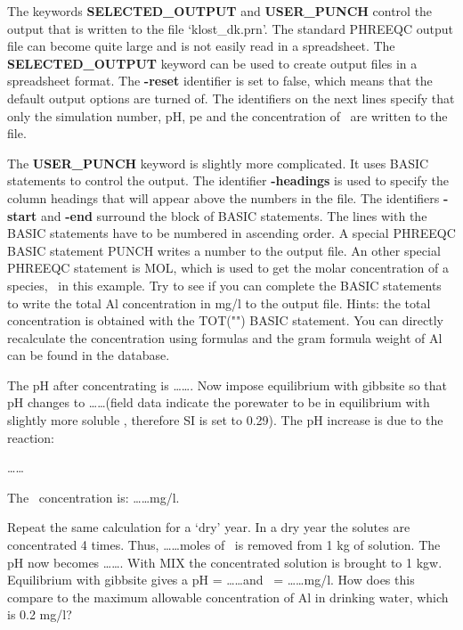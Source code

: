 The keywords \textbf{SELECTED\_OUTPUT} and \textbf{USER\_PUNCH} control the output that is written to the file `klost\_dk.prn'. The standard PHREEQC output file can become quite large and is not easily read in a spreadsheet. The \textbf{SELECTED\_OUTPUT} keyword can be used to create output files in a spreadsheet format. The \textbf{-reset} identifier is set to false, which means that the default output options are turned of. The identifiers on the next lines specify that only the simulation number, pH, pe and the concentration of \ox\ are written to the file.

The \textbf{USER\_PUNCH} keyword is slightly more complicated. It uses BASIC statements to control the output. The identifier \textbf{-headings} is used to specify the column headings that will appear above the numbers in the file. The identifiers \textbf{-start} and \textbf{-end} surround the block of BASIC statements. The lines with the BASIC statements have to be numbered in ascending order. A special PHREEQC BASIC statement PUNCH writes a number to the output file. An other special PHREEQC statement is MOL, which is used to get the molar concentration of a species, \no\ in this example. Try to see if you can complete the BASIC statements to write the total Al concentration in mg/l to the output file. Hints: the total concentration is obtained with the TOT("") BASIC statement. You can directly recalculate the concentration using formulas and the gram formula weight of Al can be found in the database.

The pH after concentrating is \ldots\ldots. Now impose equilibrium with gibbsite so that pH changes to \ldots\ldots (field data indicate the porewater to be in equilibrium with slightly more soluble \gi, therefore SI is set to 0.29). The pH increase is due to the reaction:

 \ldots\ldots

The \al\ concentration is:  \ldots\ldots mg/l.

Repeat the same calculation for a `dry' year. In a dry year the solutes are concentrated 4 times. Thus, \ldots\ldots moles of \wa\ is removed from 1 kg of solution. The pH now becomes \ldots\ldots. With MIX the concentrated solution is brought to 1 kgw. Equilibrium with gibbsite gives a pH = \ldots\ldots and \al\ = \ldots\ldots mg/l. How does this compare to the maximum allowable concentration of Al in drinking water, which is 0.2 mg/l?
